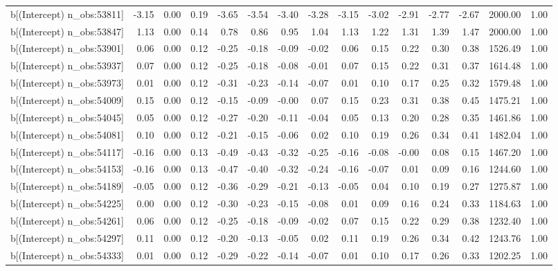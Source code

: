 \begin{table}[ht]
\begin{tabular}{rrrrrrrrrrrrrrr}
  b[(Intercept) n\_obs:53811] & -3.15 & 0.00 & 0.19 & -3.65 & -3.54 & -3.40 & -3.28 & -3.15 & -3.02 & -2.91 & -2.77 & -2.67 & 2000.00 & 1.00 \\ 
  b[(Intercept) n\_obs:53847] & 1.13 & 0.00 & 0.14 & 0.78 & 0.86 & 0.95 & 1.04 & 1.13 & 1.22 & 1.31 & 1.39 & 1.47 & 2000.00 & 1.00 \\ 
  b[(Intercept) n\_obs:53901] & 0.06 & 0.00 & 0.12 & -0.25 & -0.18 & -0.09 & -0.02 & 0.06 & 0.15 & 0.22 & 0.30 & 0.38 & 1526.49 & 1.00 \\ 
  b[(Intercept) n\_obs:53937] & 0.07 & 0.00 & 0.12 & -0.25 & -0.18 & -0.08 & -0.01 & 0.07 & 0.15 & 0.22 & 0.31 & 0.37 & 1614.48 & 1.00 \\ 
  b[(Intercept) n\_obs:53973] & 0.01 & 0.00 & 0.12 & -0.31 & -0.23 & -0.14 & -0.07 & 0.01 & 0.10 & 0.17 & 0.25 & 0.32 & 1579.48 & 1.00 \\ 
  b[(Intercept) n\_obs:54009] & 0.15 & 0.00 & 0.12 & -0.15 & -0.09 & -0.00 & 0.07 & 0.15 & 0.23 & 0.31 & 0.38 & 0.45 & 1475.21 & 1.00 \\ 
  b[(Intercept) n\_obs:54045] & 0.05 & 0.00 & 0.12 & -0.27 & -0.20 & -0.11 & -0.04 & 0.05 & 0.13 & 0.20 & 0.28 & 0.35 & 1461.86 & 1.00 \\ 
  b[(Intercept) n\_obs:54081] & 0.10 & 0.00 & 0.12 & -0.21 & -0.15 & -0.06 & 0.02 & 0.10 & 0.19 & 0.26 & 0.34 & 0.41 & 1482.04 & 1.00 \\ 
  b[(Intercept) n\_obs:54117] & -0.16 & 0.00 & 0.13 & -0.49 & -0.43 & -0.32 & -0.25 & -0.16 & -0.08 & -0.00 & 0.08 & 0.15 & 1467.20 & 1.00 \\ 
  b[(Intercept) n\_obs:54153] & -0.16 & 0.00 & 0.13 & -0.47 & -0.40 & -0.32 & -0.24 & -0.16 & -0.07 & 0.01 & 0.09 & 0.16 & 1244.60 & 1.00 \\ 
  b[(Intercept) n\_obs:54189] & -0.05 & 0.00 & 0.12 & -0.36 & -0.29 & -0.21 & -0.13 & -0.05 & 0.04 & 0.10 & 0.19 & 0.27 & 1275.87 & 1.00 \\ 
  b[(Intercept) n\_obs:54225] & 0.00 & 0.00 & 0.12 & -0.30 & -0.23 & -0.15 & -0.08 & 0.01 & 0.09 & 0.16 & 0.24 & 0.33 & 1184.63 & 1.00 \\ 
  b[(Intercept) n\_obs:54261] & 0.06 & 0.00 & 0.12 & -0.25 & -0.18 & -0.09 & -0.02 & 0.07 & 0.15 & 0.22 & 0.29 & 0.38 & 1232.40 & 1.00 \\ 
  b[(Intercept) n\_obs:54297] & 0.11 & 0.00 & 0.12 & -0.20 & -0.13 & -0.05 & 0.02 & 0.11 & 0.19 & 0.26 & 0.34 & 0.42 & 1243.76 & 1.00 \\ 
  b[(Intercept) n\_obs:54333] & 0.01 & 0.00 & 0.12 & -0.29 & -0.22 & -0.14 & -0.07 & 0.01 & 0.10 & 0.17 & 0.26 & 0.33 & 1202.25 & 1.00 \\ 

\end{tabular}
\end{table}
